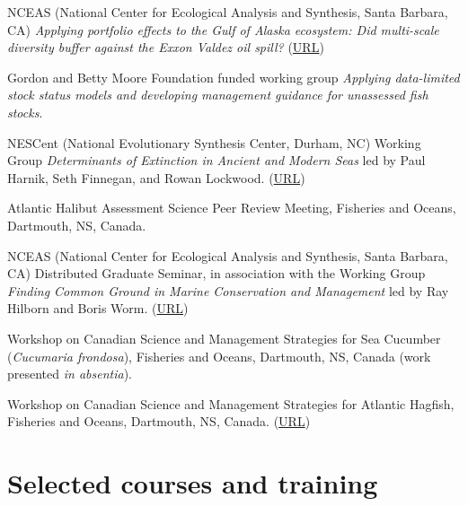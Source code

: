 \begin{description}
\tightlist
\item[2015-16]
NCEAS (National Center for Ecological Analysis and Synthesis, Santa
Barbara, CA) \emph{Applying portfolio effects to the Gulf of Alaska
ecosystem: Did multi-scale diversity buffer against the Exxon Valdez oil
spill?} (\href{https://www.nceas.ucsb.edu/featured/marshall}{URL})
\item[2015-16]
Gordon and Betty Moore Foundation funded working group \emph{Applying
data-limited stock status models and developing management guidance for
unassessed fish stocks}.
\item[2011--13]
NESCent (National Evolutionary Synthesis Center, Durham, NC) Working
Group \emph{Determinants of Extinction in Ancient and Modern Seas} led
by Paul Harnik, Seth Finnegan, and Rowan Lockwood.
(\href{http://www.nescent.org/science/awards_summary.php?id=256}{URL})
\item[2010]
Atlantic Halibut Assessment Science Peer Review Meeting, Fisheries and
Oceans, Dartmouth, NS, Canada.
\item[2007--09]
NCEAS (National Center for Ecological Analysis and Synthesis, Santa
Barbara, CA) Distributed Graduate Seminar, in association with the
Working Group \emph{Finding Common Ground in Marine Conservation and
Management} led by Ray Hilborn and Boris Worm.
(\href{http://www.nceas.ucsb.edu/projects/12307}{URL})
\item[2008]
Workshop on Canadian Science and Management Strategies for Sea Cucumber
(\emph{Cucumaria frondosa}), Fisheries and Oceans, Dartmouth, NS, Canada
(work presented \emph{in absentia}).
\item[2007]
Workshop on Canadian Science and Management Strategies for Atlantic
Hagfish, Fisheries and Oceans, Dartmouth, NS, Canada.
(\href{http://www.dfo-mpo.gc.ca/CSAS/Csas/Publications/Pro-CR/2009/2009_009_e.htm}{URL})
\end{description}

\section{Selected courses and
training}\label{selected-courses-and-training}


